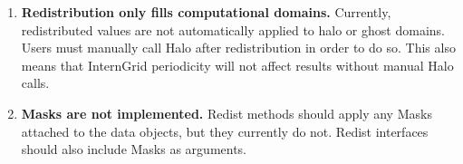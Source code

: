 

\begin{enumerate}

\item {\bf Redistribution only fills computational domains.}  Currently,
redistributed values are not automatically applied to halo or ghost
domains.  Users must manually call Halo after redistribution in order
to do so.  This also means that InternGrid periodicity will not affect
results without manual Halo calls.

\item {\bf Masks are not implemented.}  Redist methods should apply
any Masks attached to the data objects, but they currently do not.  Redist
interfaces should also include Masks as arguments.

\end{enumerate}


